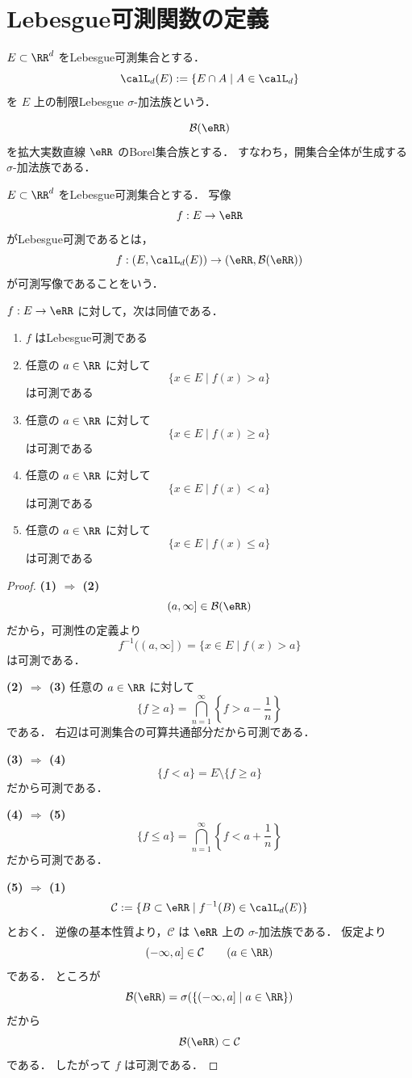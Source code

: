 \section{Lebesgue可測関数の定義}

\begin{definition}
$E \subset \RR^d$ をLebesgue可測集合とする．
\[
\calL_d(E):=\{E\cap A \mid A\in \calL_d\}
\]
を $E$ 上の制限Lebesgue $\sigma$-加法族という．
\end{definition}

\begin{definition}[Borel集合族]
\[
\mathcal B(\eRR)
\]
を拡大実数直線 $\eRR$ のBorel集合族とする．
すなわち，開集合全体が生成する $\sigma$-加法族である．
\end{definition}

\begin{definition}[Lebesgue可測関数]
$E \subset \RR^d$ をLebesgue可測集合とする．
写像
\[
f:E\to \eRR
\]
がLebesgue可測であるとは，
\[
f:(E,\calL_d(E))\to (\eRR,\mathcal B(\eRR))
\]
が可測写像であることをいう．
\end{definition}

\begin{theorem}[判定法]
$f:E\to\eRR$ に対して，次は同値である．
\begin{enumerate}
    \item $f$ はLebesgue可測である
    \item 任意の $a\in\RR$ に対して
    \[
    \{x\in E \mid f(x)>a\}
    \]
    は可測である
    \item 任意の $a\in\RR$ に対して
    \[
    \{x\in E \mid f(x)\ge a\}
    \]
    は可測である
    \item 任意の $a\in\RR$ に対して
    \[
    \{x\in E \mid f(x)<a\}
    \]
    は可測である
    \item 任意の $a\in\RR$ に対して
    \[
    \{x\in E \mid f(x)\le a\}
    \]
    は可測である
\end{enumerate}
\end{theorem}
\begin{proof}
\textbf{(1) $\Rightarrow$ (2)}\quad
\[
(a,\infty]\in \mathcal B(\eRR)
\]
だから，可測性の定義より
\[
f^{-1}((a,\infty])
=
\{x\in E \mid f(x)>a\}
\]
は可測である．

\textbf{(2) $\Rightarrow$ (3)}\quad
任意の $a\in\RR$ に対して
\[
\{f\ge a\}
=
\bigcap_{n=1}^{\infty}\left\{f>a-\frac1n\right\}
\]
である．
右辺は可測集合の可算共通部分だから可測である．

\textbf{(3) $\Rightarrow$ (4)}\quad
\[
\{f<a\}=E\setminus\{f\ge a\}
\]
だから可測である．

\textbf{(4) $\Rightarrow$ (5)}\quad
\[
\{f\le a\}
=
\bigcap_{n=1}^{\infty}\left\{f<a+\frac1n\right\}
\]
だから可測である．

\textbf{(5) $\Rightarrow$ (1)}\quad
\[
\mathcal C:=\{B\subset \eRR \mid f^{-1}(B)\in \calL_d(E)\}
\]
とおく．
逆像の基本性質より，$\mathcal C$ は $\eRR$ 上の $\sigma$-加法族である．
仮定より
\[
(-\infty,a]\in \mathcal C
\qquad (a\in\RR)
\]
である．
ところが
\[
\mathcal B(\eRR)=\sigma(\{(-\infty,a]\mid a\in\RR\})
\]
だから
\[
\mathcal B(\eRR)\subset \mathcal C
\]
である．
したがって $f$ は可測である．
\end{proof}

